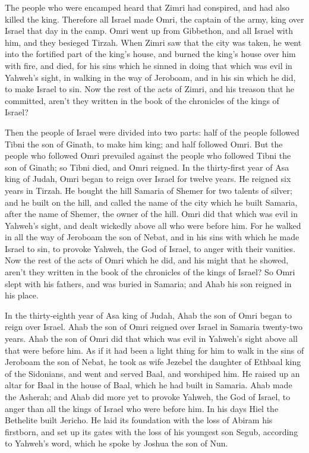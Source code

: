 {The people who were encamped heard that Zimri had conspired, and had also killed the king. Therefore all Israel made Omri, the captain of the army, king over Israel that day in the camp.
Omri went up from Gibbethon, and all Israel with him, and they besieged Tirzah.
When Zimri saw that the city was taken, he went into the fortified part of the king’s house, and burned the king’s house over him with fire, and died,
for his sins which he sinned in doing that which was evil in Yahweh’s sight, in walking in the way of Jeroboam, and in his sin which he did, to make Israel to sin.
Now the rest of the acts of Zimri, and his treason that he committed, aren’t they written in the book of the chronicles of the kings of Israel?
\par }{\PP {}Then the people of Israel were divided into two parts: half of the people followed Tibni the son of Ginath, to make him king; and half followed Omri.
But the people who followed Omri prevailed against the people who followed Tibni the son of Ginath; so Tibni died, and Omri reigned.
In the thirty-first year of Asa king of Judah, Omri began to reign over Israel for twelve years. He reigned six years in Tirzah.
He bought the hill Samaria of Shemer for two talents of silver; and he built on the hill, and called the name of the city which he built Samaria, after the name of Shemer, the owner of the hill.
Omri did that which was evil in Yahweh’s sight, and dealt wickedly above all who were before him.
For he walked in all the way of Jeroboam the son of Nebat, and in his sins with which he made Israel to sin, to provoke Yahweh, the God of Israel, to anger with their vanities.
Now the rest of the acts of Omri which he did, and his might that he showed, aren’t they written in the book of the chronicles of the kings of Israel?
So Omri slept with his fathers, and was buried in Samaria; and Ahab his son reigned in his place.
\par }{\PP {}In the thirty-eighth year of Asa king of Judah, Ahab the son of Omri began to reign over Israel. Ahab the son of Omri reigned over Israel in Samaria twenty-two years.
Ahab the son of Omri did that which was evil in Yahweh’s sight above all that were before him.
As if it had been a light thing for him to walk in the sins of Jeroboam the son of Nebat, he took as wife Jezebel the daughter of Ethbaal king of the Sidonians, and went and served Baal, and worshiped him.
He raised up an altar for Baal in the house of Baal, which he had built in Samaria.
Ahab made the Asherah; and Ahab did more yet to provoke Yahweh, the God of Israel, to anger than all the kings of Israel who were before him.
In his days Hiel the Bethelite built Jericho. He laid its foundation with the loss of Abiram his firstborn, and set up its gates with the loss of his youngest son Segub, according to Yahweh’s word, which he spoke by Joshua the son of Nun.

}
